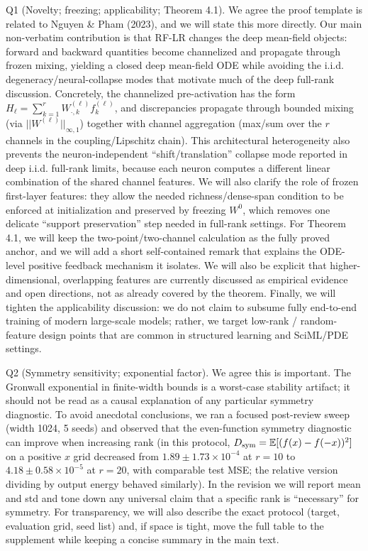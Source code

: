 Q1 (Novelty; freezing; applicability; Theorem 4.1). We agree the proof template is related to Nguyen & Pham (2023), and we will state this more directly. Our main non-verbatim contribution is that RF-LR changes the deep mean-field objects: forward and backward quantities become channelized and propagate through frozen mixing, yielding a closed deep mean-field ODE while avoiding the i.i.d. degeneracy/neural-collapse modes that motivate much of the deep full-rank discussion. Concretely, the channelized pre-activation has the form $H_\ell=\sum_{k=1}^r W^{(\ell)}_{\cdot,k} f_k^{(\ell)}$, and discrepancies propagate through bounded mixing (via $||W^{(\ell)}||_{\infty,1}$) together with channel aggregation (max/sum over the $r$ channels in the coupling/Lipschitz chain).
This architectural heterogeneity also prevents the neuron-independent “shift/translation” collapse mode reported in deep i.i.d. full-rank limits, because each neuron computes a different linear combination of the shared channel features.
We will also clarify the role of frozen first-layer features: they allow the needed richness/dense-span condition to be enforced at initialization and preserved by freezing $W^0$, which removes one delicate “support preservation” step needed in full-rank settings.
For Theorem 4.1, we will keep the two-point/two-channel calculation as the fully proved anchor, and we will add a short self-contained remark that explains the ODE-level positive feedback mechanism it isolates. We will also be explicit that higher-dimensional, overlapping features are currently discussed as empirical evidence and open directions, not as already covered by the theorem.
Finally, we will tighten the applicability discussion: we do not claim to subsume fully end-to-end training of modern large-scale models; rather, we target low-rank / random-feature design points that are common in structured learning and SciML/PDE settings.

Q2 (Symmetry sensitivity; exponential factor). We agree this is important. The Gronwall exponential in finite-width bounds is a worst-case stability artifact; it should not be read as a causal explanation of any particular symmetry diagnostic. To avoid anecdotal conclusions, we ran a focused post-review sweep (width 1024, 5 seeds) and observed that the even-function symmetry diagnostic can improve when increasing rank (in this protocol, $D_{\rm sym}=\mathbb E[(f(x)-f(-x))^2]$ on a positive $x$ grid decreased from $1.89\pm1.73\times10^{-4}$ at $r=10$ to $4.18\pm0.58\times10^{-5}$ at $r=20$, with comparable test MSE; the relative version dividing by output energy behaved similarly). In the revision we will report mean and std and tone down any universal claim that a specific rank is “necessary” for symmetry.
For transparency, we will also describe the exact protocol (target, evaluation grid, seed list) and, if space is tight, move the full table to the supplement while keeping a concise summary in the main text.

